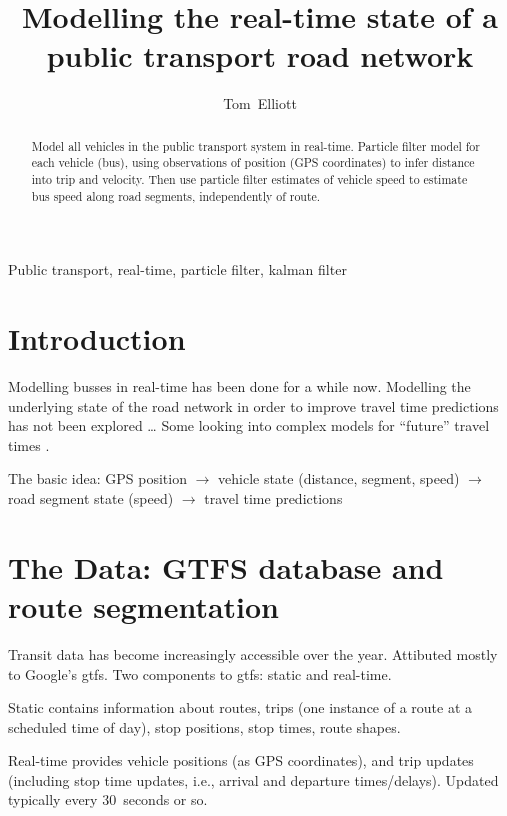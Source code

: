 \documentclass[draftcls,a4paper,onecolumn]{IEEEtran}\usepackage[]{graphicx}\usepackage[]{color}
\title{Modelling the real-time state of a public transport road network}
\author{Tom~Elliott}
\begin{document}
\maketitle


\begin{abstract}
  Model all vehicles in the public transport system in real-time.
  Particle filter model for each vehicle (bus),
  using observations of position (GPS coordinates) to infer distance into trip
  and velocity.
  Then use particle filter estimates of vehicle speed to estimate bus speed along
  road segments, independently of route.
  
\end{abstract}



\begin{IEEEkeywords}
  Public transport, real-time, particle filter, kalman filter
\end{IEEEkeywords}

\section{Introduction}
\label{sec:intro}


Modelling busses in real-time has been done for a while now.
Modelling the underlying state of the road network in order to improve 
travel time predictions has not been explored \ldots
Some looking into complex models for ``future'' travel times \cite{Julio2016}.


The basic idea:
GPS position $\rightarrow$ 
vehicle state (distance, segment, speed) $\rightarrow$
road segment state (speed) $\rightarrow$
travel time predictions



\section{The Data: GTFS database and route segmentation}
\label{sec:data}

Transit data has become increasingly accessible over the year.
Attibuted mostly to Google's \gls{gtfs}.
Two components to \gls{gtfs}: static and real-time.

Static contains information about routes, trips (one instance of a route at a scheduled time of day),
stop positions, stop times, route shapes.

Real-time provides vehicle positions (as GPS coordinates),
and trip updates (including stop time updates, i.e., arrival and departure times/delays).
Updated typically every 30~seconds or so.
\end{document}
